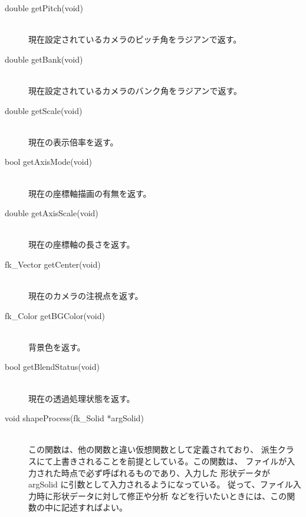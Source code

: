 \begin{description}
 \item[\hspace*{0.6cm}double getPitch(void)] ~ \\
	現在設定されているカメラのピッチ角をラジアンで返す。

 \item[\hspace*{0.6cm}double getBank(void)] ~ \\
	現在設定されているカメラのバンク角をラジアンで返す。

 \item[\hspace*{0.6cm}double getScale(void)] ~ \\
	現在の表示倍率を返す。

 \item[\hspace*{0.6cm}bool getAxisMode(void)] ~ \\
	現在の座標軸描画の有無を返す。

 \item[\hspace*{0.6cm}double getAxisScale(void)] ~ \\
	現在の座標軸の長さを返す。

 \item[\hspace*{0.6cm}fk\_Vector getCenter(void)] ~ \\
	現在のカメラの注視点を返す。

 \item[\hspace*{0.6cm}fk\_Color getBGColor(void)] ~ \\
	背景色を返す。

 \item[\hspace*{0.6cm}bool getBlendStatus(void)] ~ \\
	現在の透過処理状態を返す。

 \item[\hspace*{0.6cm}void shapeProcess(fk\_Solid *argSolid)] ~ \\
	この関数は、他の関数と違い仮想関数として定義されており、
	派生クラスにて上書きされることを前提としている。この関数は、
	ファイルが入力された時点で必ず呼ばれるものであり、入力した
	形状データが argSolid に引数として入力されるようになっている。
	従って、ファイル入力時に形状データに対して修正や分析
	などを行いたいときには、この関数の中に記述すればよい。


\end{description}
